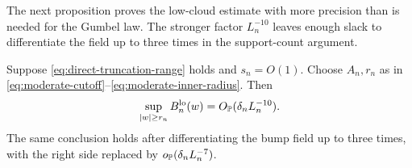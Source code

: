 The next proposition proves the low-cloud estimate with more precision than
is needed for the Gumbel law. The stronger factor \(L_n^{-10}\) leaves enough
slack to differentiate the field up to three times in the support-count
argument.

\begin{proposition}
\label{prop:moderate-low-cloud}
Suppose \eqref{eq:direct-truncation-range} holds and \(s_n=O(1)\). Choose \(A_n,r_n\)
as in \eqref{eq:moderate-cutoff}--\eqref{eq:moderate-inner-radius}. Then
\begin{equation}
\label{eq:moderate-low-cloud}
  \sup_{|w|\ge r_n}B_n^{\rm lo}(w)
  =O_{\mathbb P}(\delta_nL_n^{-10}).
\end{equation}
The same conclusion holds after differentiating the bump field up to three
times, with the right side replaced by \(o_{\mathbb P}(\delta_nL_n^{-7})\).
\end{proposition}

